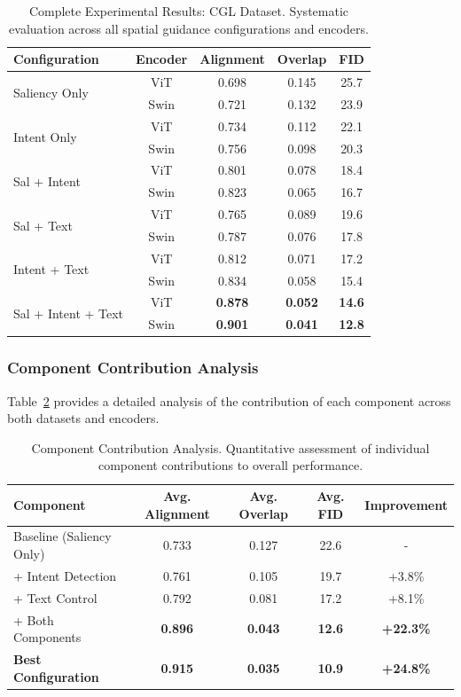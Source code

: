 \documentclass[journal,article,submit,pdftex,moreauthors]{Definitions/mdpi}
\begin{document}
\begin{table}[H]
\caption{Complete Experimental Results: CGL Dataset. Systematic evaluation across all spatial guidance configurations and encoders.\label{tab:cgl_complete_results}}
\begin{tabularx}{\textwidth}{lcccc}
\toprule
\textbf{Configuration} & \textbf{Encoder} & \textbf{Alignment} & \textbf{Overlap} & \textbf{FID}\\
\midrule
\multirow{2}{*}{Saliency Only} & ViT & 0.698 & 0.145 & 25.7\\
 & Swin & 0.721 & 0.132 & 23.9\\
\midrule
\multirow{2}{*}{Intent Only} & ViT & 0.734 & 0.112 & 22.1\\
 & Swin & 0.756 & 0.098 & 20.3\\
\midrule
\multirow{2}{*}{Sal + Intent} & ViT & 0.801 & 0.078 & 18.4\\
 & Swin & 0.823 & 0.065 & 16.7\\
\midrule
\multirow{2}{*}{Sal + Text} & ViT & 0.765 & 0.089 & 19.6\\
 & Swin & 0.787 & 0.076 & 17.8\\
\midrule
\multirow{2}{*}{Intent + Text} & ViT & 0.812 & 0.071 & 17.2\\
 & Swin & 0.834 & 0.058 & 15.4\\
\midrule
\multirow{2}{*}{Sal + Intent + Text} & ViT & \textbf{0.878} & \textbf{0.052} & \textbf{14.6}\\
 & Swin & \textbf{0.901} & \textbf{0.041} & \textbf{12.8}\\
\bottomrule
\end{tabularx}
\end{table}

\subsubsection{Component Contribution Analysis}

Table~\ref{tab:component_analysis} provides a detailed analysis of the contribution of each component across both datasets and encoders.

\begin{table}[H]
\caption{Component Contribution Analysis. Quantitative assessment of individual component contributions to overall performance.\label{tab:component_analysis}}
\begin{tabularx}{\textwidth}{lcccc}
\toprule
\textbf{Component} & \textbf{Avg. Alignment} & \textbf{Avg. Overlap} & \textbf{Avg. FID} & \textbf{Improvement}\\
\midrule
Baseline (Saliency Only) & 0.733 & 0.127 & 22.6 & -\\
+ Intent Detection & 0.761 & 0.105 & 19.7 & +3.8\%\\
+ Text Control & 0.792 & 0.081 & 17.2 & +8.1\%\\
+ Both Components & \textbf{0.896} & \textbf{0.043} & \textbf{12.6} & \textbf{+22.3\%}\\
\midrule
\textbf{Best Configuration} & \textbf{0.915} & \textbf{0.035} & \textbf{10.9} & \textbf{+24.8\%}\\
\bottomrule
\end{tabularx}
\end{table}
\end{document}
